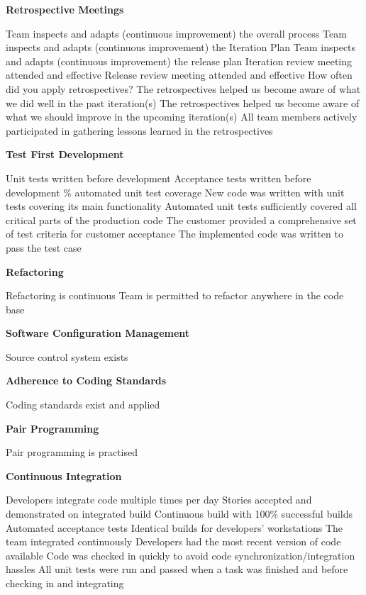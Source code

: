 \textbf{Retrospective Meetings}
\begin{itemize}
	\taa Team inspects and adapts (continuous improvement) the overall process
	\taa Team inspects and adapts (continuous improvement) the Iteration Plan 
	\taa Team inspects and adapts (continuous improvement) the release plan
	\taa Iteration review meeting attended and effective
	\taa Release review meeting attended and effective
	\pam How often did you apply retrospectives?
	\pam The retrospectives helped us become aware of what we did well in the past iteration(s)
	\pam The retrospectives helped us become aware of what we should improve in the upcoming iteration(s) 
	\pam All team members actively participated in gathering lessons learned in the retrospectives

\end{itemize}

\textbf{Test First Development}
\begin{itemize}
	\taa Unit tests written before development
	\taa Acceptance tests written before development
	\% automated unit test coverage
	\pam New code was written with unit tests covering its main functionality
	\pam Automated unit tests sufficiently covered all critical parts of the production code
	\pam The customer provided a comprehensive set of test criteria for customer acceptance
	\pam The implemented code was written to pass the test case
\end{itemize}

\textbf{Refactoring}
\begin{itemize}
	\taa Refactoring is continuous
	\taa Team is permitted to refactor anywhere in the code base
\end{itemize}

\textbf{Software Configuration Management}
\begin{itemize}
	\taa Source control system exists
\end{itemize}

\textbf{Adherence to Coding Standards}
\begin{itemize}
	\taa Coding standards exist and applied
\end{itemize}

\textbf{Pair Programming}
\begin{itemize}
	\taa Pair programming is practised
\end{itemize}

\textbf{Continuous Integration}
\begin{itemize}
	\taa Developers integrate code multiple times per day
	\taa Stories accepted and demonstrated on integrated build
	\taa Continuous build with 100\% successful builds
	\taa Automated acceptance tests
	\taa Identical builds for developers' workstations
	\pam The team integrated continuously
	\pam Developers had the most recent version of code available
	\pam Code was checked in quickly to avoid code synchronization/integration hassles
	\pam All unit tests were run and passed when a task was finished and before checking in and integrating 
\end{itemize}


